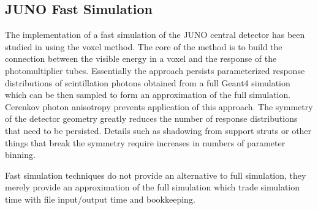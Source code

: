 \documentclass[a4paper]{jpconf}
\begin{document}
\subsection{JUNO Fast Simulation}

The implementation of a fast simulation of the JUNO central detector has 
been studied in\cite{junoFastSim} using the voxel method. The core
of the method is to build the connection between the visible energy
in a voxel and the response of the photomultiplier tubes.
Essentially the approach persists parameterized response distributions 
of scintillation photons obtained from a full Geant4 simulation which 
can be then sampled to form an approximation of the full simulation.
Cerenkov photon anisotropy prevents application of this approach.
The symmetry of the detector geometry greatly reduces the number of 
response distributions that need to be persisted. Details such as 
shadowing from support struts or other things that break the symmetry 
require increases in numbers of parameter binning.  

Fast simulation techniques do not provide an alternative to full simulation, 
they merely provide an approximation of the full simulation which trade 
simulation time with file input/output time and bookkeeping. 
  
%
%
%

\end{document}
